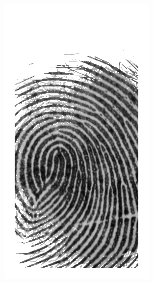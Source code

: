 \documentclass{beamer}
\begin{document}
{\begin{figure}[!ht]
\begin{subfigure}[ht]{0.15\textwidth}
            \includegraphics[width=\textwidth]{fingerprints/2002Db2a/1_2_filtered.jpg}
        \end{subfigure}
    \end{figure}
}
\end{document}
